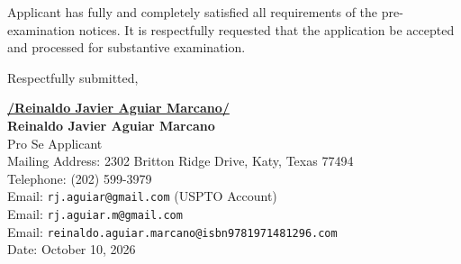 \documentclass[11pt,letterpaper]{article}
\begin{document}
Applicant has fully and completely satisfied all requirements of the pre-examination notices. It is respectfully requested that the application be accepted and processed for substantive examination.

\vspace{0.8cm}
\begin{singlespace}
\noindent Respectfully submitted, \par\vspace{1.5cm}
\underline{\textbf{/Reinaldo Javier Aguiar Marcano/}} \\
\textbf{Reinaldo Javier Aguiar Marcano} \\
Pro Se Applicant \\
Mailing Address: 2302 Britton Ridge Drive, Katy, Texas 77494 \\
Telephone: (202) 599-3979 \\
Email: \texttt{rj.aguiar@gmail.com} (USPTO Account) \\
Email: \texttt{rj.aguiar.m@gmail.com} \\
Email: \texttt{reinaldo.aguiar.marcano@isbn9781971481296.com} \\
Date: October 10, 2026
\end{singlespace}
\end{document}
